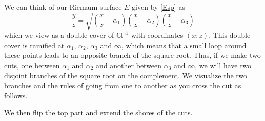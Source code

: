 \documentclass[11pt]{article}
\numberwithin{equation}{section}
\numberwithin{footnote}{section}
\renewcommand{\P}{{\mathbb P}}
\newcommand{\C}{{\mathbb C}}
\begin{document}
\smallskip
We can think of our Riemann surface $E$ given by \eqref{Esp} as 
$$
\frac yz = \sqrt{
\left(\frac xz-\alpha_1\right)\left(\frac xz-\alpha_2\right)\left(\frac xz-\alpha_3\right)
}
$$
which we view as a double cover of $\C\P^1$ with coordinates $(x:z)$. 
This double cover is ramified at $\alpha_1$, $\alpha_2$, $\alpha_3$ and $\infty$, which means that a small loop around these points leads to an opposite branch of the square root. Thus, if we make two cuts, one between $\alpha_1$ and $\alpha_2$ and another between
$\alpha_3$ and $\infty$, we will have two disjoint branches of the square root on the complement. 
We visualize the two branches and the rules of going from one to another as you cross the cut as follows. 


\noindent
We then flip the top part and extend the shores of the cuts.
\end{document}
